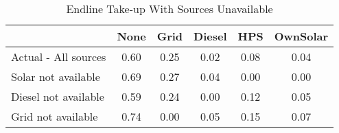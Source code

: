 \begin{table}[htbp]\centering
\caption{Endline Take-up With Sources Unavailable\label {tab1}}
\begin{tabular}{l*{5}{c}}
\toprule
            &        None&        Grid&      Diesel&         HPS&    OwnSolar\\
\midrule
Actual - All sources&        0.60&        0.25&        0.02&        0.08&        0.04\\
Solar not available&        0.69&        0.27&        0.04&        0.00&        0.00\\
Diesel not available&        0.59&        0.24&        0.00&        0.12&        0.05\\
Grid not available&        0.74&        0.00&        0.05&        0.15&        0.07\\
\bottomrule
\end{tabular}
\end{table}
